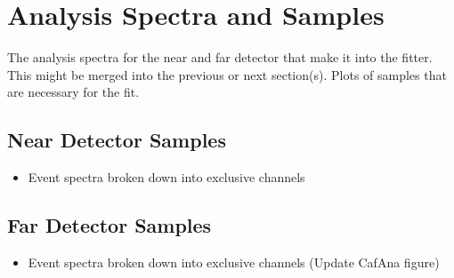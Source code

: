\section{Analysis Spectra and Samples}

The analysis spectra for the near and far detector that make it into the fitter. This might be merged into the previous or next section(s). Plots of samples that are necessary for the fit. 

\subsection{Near  Detector Samples}
\begin{itemize}
\item Event spectra broken down into exclusive channels 
\end{itemize}

\subsection{Far Detector Samples}
\begin{itemize}
\item Event spectra broken down into exclusive channels (Update CafAna figure)
\end{itemize}